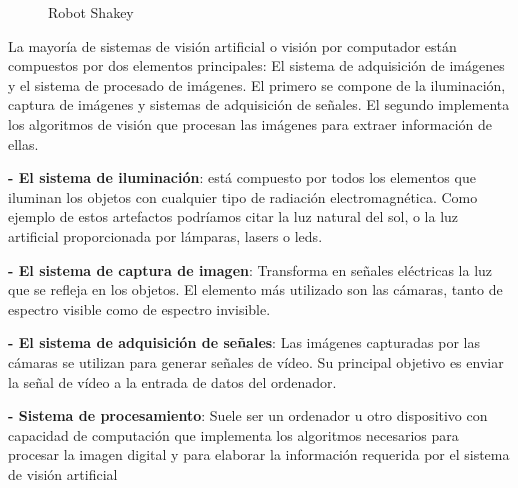 \begin{figure}[htbp]
\begin{center}
\end{center}
\caption{Robot Shakey }
\end{figure}
La mayoría de sistemas de visión artificial o visión por computador están compuestos por dos elementos principales:  El sistema de adquisición de imágenes y el sistema de procesado de imágenes. El primero se compone de la iluminación, captura de imágenes y sistemas de adquisición de señales. El segundo implementa los algoritmos de visión que procesan las imágenes para extraer información de ellas.

	\textbf{- El sistema de iluminación}: está compuesto por todos los elementos que iluminan los objetos con cualquier tipo de radiación electromagnética. Como ejemplo de estos artefactos podríamos citar la luz natural del sol, o la luz artificial proporcionada por lámparas, lasers o leds.

	\textbf{- El sistema de captura de imagen}: Transforma en señales eléctricas la luz que se refleja en los objetos. El elemento más utilizado son las cámaras, tanto de espectro visible como de espectro invisible.

	\textbf{- El sistema de adquisición de señales}: Las imágenes capturadas por las cámaras se utilizan para generar señales de vídeo. Su principal objetivo es enviar la señal de vídeo a la entrada de datos del ordenador.

	\textbf{- Sistema de procesamiento}: Suele ser un ordenador u otro dispositivo con capacidad de computación que implementa los algoritmos necesarios para procesar la imagen digital y para elaborar la información requerida por el sistema de visión artificial

